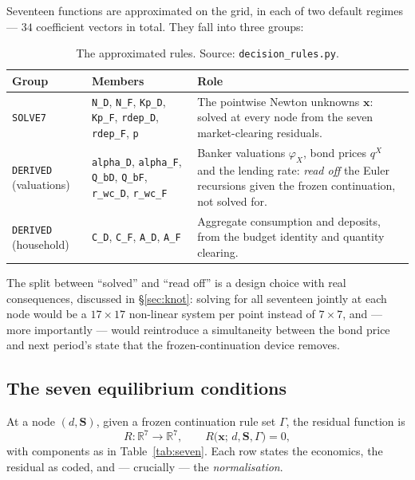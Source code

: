\documentclass[11pt]{article}
\numberwithin{equation}{section}
\newcommand{\R}{\mathbb{R}}
\newcommand{\code}[1]{\texttt{\small #1}}
\newcommand{\bx}{\mathbf{x}}
\newcommand{\bS}{\mathbf{S}}
\theoremstyle{definition}
\theoremstyle{plain}
\theoremstyle{remark}
\begin{document}
Seventeen functions are approximated on the grid, in each of two default regimes ---
$34$ coefficient vectors in total. They fall into three groups:

\begin{table}[htbp]
\centering\small
\caption{The approximated rules. Source: \code{decision\_rules.py}.}
\label{tab:rules}
\begin{tabular}{@{}l>{\raggedright\arraybackslash}p{3.5cm}p{7.0cm}@{}}
\toprule
Group & Members & Role \\
\midrule
\code{SOLVE7}   & \code{N\_D}, \code{N\_F}, \code{Kp\_D}, \code{Kp\_F},
                  \code{rdep\_D}, \code{rdep\_F}, \code{p}
                & The pointwise Newton unknowns $\bx$: solved at every node from the
                  seven market-clearing residuals. \\
\addlinespace
\code{DERIVED} (valuations) & \code{alpha\_D}, \code{alpha\_F},
                  \code{Q\_bD}, \code{Q\_bF}, \code{r\_wc\_D}, \code{r\_wc\_F}
                & Banker valuations $\varphi_X$, bond prices $q^{X}$ and the lending
                  rate: \emph{read off} the Euler recursions given the frozen
                  continuation, not solved for. \\
\addlinespace
\code{DERIVED} (household) & \code{C\_D}, \code{C\_F}, \code{A\_D}, \code{A\_F}
                & Aggregate consumption and deposits, from the budget identity and
                  quantity clearing. \\
\bottomrule
\end{tabular}
\end{table}

The split between ``solved'' and ``read off'' is a design choice with real
consequences, discussed in \S\ref{sec:knot}: solving for all seventeen jointly at
each node would be a $17\times17$ non-linear system per point instead of $7\times7$,
and --- more importantly --- would reintroduce a simultaneity between the bond price
and next period's state that the frozen-continuation device removes.

\subsection{The seven equilibrium conditions}

At a node $(d,\bS)$, given a frozen continuation rule set $\Gamma$, the residual
function is
\begin{equation}
R:\R^{7}\to\R^{7},
\qquad
R\bigl(\bx;\,d,\bS,\Gamma\bigr)=0,
\label{eq:R-def}
\end{equation}
with components as in Table~\ref{tab:seven}. Each row states the economics, the
residual as coded, and --- crucially --- the \emph{normalisation}.
\end{document}
